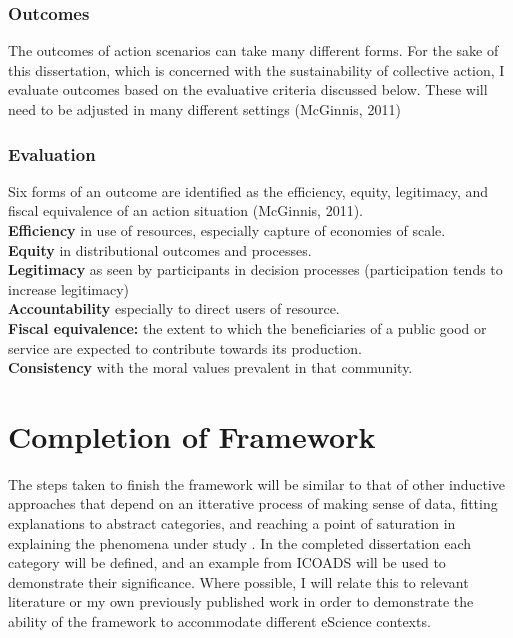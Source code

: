\documentclass[thesis,tocnosub,noragright,centerchapter,12pt]{uiucecethesis09}
\begin{document}
{\subsubsection*{Outcomes}
The outcomes of action scenarios can take many different forms. For the sake of this
dissertation, which is concerned with the sustainability of collective
action, I evaluate outcomes based on the evaluative criteria discussed
below. These will need to be adjusted in many different settings (McGinnis, 2011)\\

\subsubsection*{Evaluation}

Six forms of an outcome are identified as the efficiency, equity, legitimacy, and fiscal
equivalence of an action situation (McGinnis, 2011).\\ 

\textbf{Efficiency} in use of
resources, especially capture of economies of scale.\\

\textbf{Equity} in
distributional outcomes and processes.\\

\textbf{Legitimacy} as seen by
participants in decision processes (participation tends to increase
legitimacy)\\

\textbf{Accountability} especially to direct users of
resource.\\

\textbf{Fiscal equivalence:} the extent to which the
beneficiaries of a public good or service are expected to contribute
towards its production.\\

\textbf{Consistency} with the moral values
prevalent in that community.\\

\section{Completion of Framework}
The steps taken to finish the framework will be similar to that of other inductive approaches that depend on an itterative process of making sense of data, fitting explanations to abstract categories, and reaching a point of saturation in explaining the phenomena under study \citep{suddaby2006editors}. In the completed dissertation each category will be defined, and an example from ICOADS will be used to demonstrate their significance. Where possible, I will relate this to relevant literature or my own previously published work in order to demonstrate the ability of the framework to accommodate different eScience contexts. 

}
\end{document}

